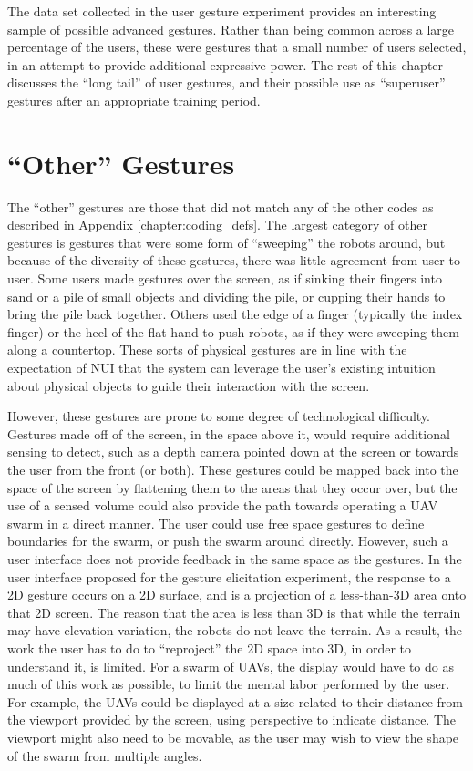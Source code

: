 The data set collected in the user gesture experiment provides an interesting sample of possible advanced gestures. 
Rather than being common across a large percentage of the users, these were gestures that a small number of users selected, in an attempt to provide additional expressive power. 
The rest of this chapter discusses the ``long tail'' of user gestures, and their possible use as ``superuser'' gestures after an appropriate training period. 

\section{``Other'' Gestures}

The ``other'' gestures are those that did not match any of the other codes as described in Appendix \ref{chapter:coding_defs}. 
The largest category of other gestures is gestures that were some form of ``sweeping'' the robots around, but because of the diversity of these gestures, there was little agreement from user to user. 
Some users made gestures over the screen, as if sinking their fingers into sand or a pile of small objects and dividing the pile, or cupping their hands to bring the pile back together. 
Others used the edge of a finger (typically the index finger) or the heel of the flat hand to push robots, as if they were sweeping them along a countertop. 
These sorts of physical gestures are in line with the expectation of NUI that the system can leverage the user's existing intuition about physical objects to guide their interaction with the screen. 

However, these gestures are prone to some degree of technological difficulty. 
Gestures made off of the screen, in the space above it, would require additional sensing to detect, such as a depth camera pointed down at the screen or towards the user from the front (or both). 
These gestures could be mapped back into the space of the screen by flattening them to the areas that they occur over, but the use of a sensed volume could also provide the path towards operating a UAV swarm in a direct manner. 
The user could use free space gestures to define boundaries for the swarm, or push the swarm around directly. 
However, such a user interface does not provide feedback in the same space as the gestures. 
In the user interface proposed for the gesture elicitation experiment, the response to a 2D gesture occurs on a 2D surface, and is a projection of a less-than-3D area onto that 2D screen.
The reason that the area is less than 3D is that while the terrain may have elevation variation, the robots do not leave the terrain. 
As a result, the work the user has to do to ``reproject'' the 2D space into 3D, in order to understand it, is limited. 
For a swarm of UAVs, the display would have to do as much of this work as possible, to limit the mental labor performed by the user. 
For example, the UAVs could be displayed at a size related to their distance from the viewport provided by the screen, using perspective to indicate distance. 
The viewport might also need to be movable, as the user may wish to view the shape of the swarm from multiple angles. 

